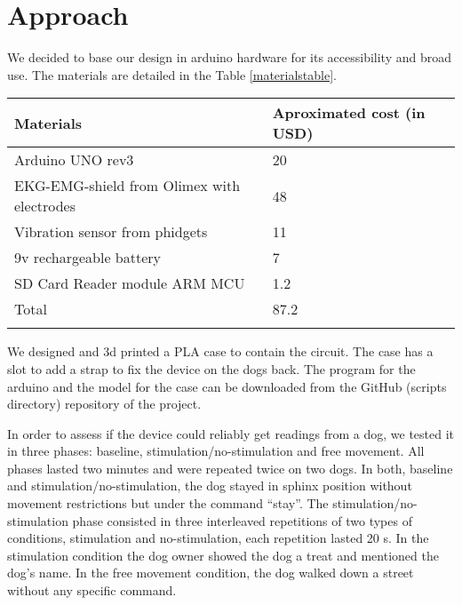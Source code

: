 \documentclass[twocolumn]{bmcart}%
\begin{document}
\section{Approach}\label{approach}

We decided to base our design in arduino hardware for its accessibility
and broad use. The materials are detailed in the Table
\ref{materialstable}.

\begin{table*}[t!]
\caption{\label{materialstable} Materials and cost. The table shows most of the materials used and their approximated cost with a local provider. Other materials were used but their cost is negligible.}
\begin{tabular}{l l}
 \hline\noalign{\smallskip}
   Materials  & Aproximated cost (in USD) \\
    \hline\noalign{\smallskip}
  Arduino UNO rev3                  & 20    \\
  EKG-EMG-shield from Olimex with electrodes    & 48    \\
  Vibration sensor from phidgets            & 11    \\
  9v rechargeable battery               & 7 \\
  SD Card Reader module ARM MCU         & 1.2   \\
  Total                     & 87.2  \\
  \noalign{\smallskip}\hline
\end{tabular}
\end{table*}

We designed and 3d printed a PLA case to contain the circuit. The case
has a slot to add a strap to fix the device on the dogs back. The
program for the arduino and the model for the case can be downloaded
from the GitHub (scripts directory) repository of the project.

In order to assess if the device could reliably get readings from a dog,
we tested it in three phases: baseline, stimulation/no-stimulation and
free movement. All phases lasted two minutes and were repeated twice on
two dogs. In both, baseline and stimulation/no-stimulation, the dog
stayed in sphinx position without movement restrictions but under the
command ``stay''. The stimulation/no-stimulation phase consisted in
three interleaved repetitions of two types of conditions, stimulation
and no-stimulation, each repetition lasted 20 s. In the stimulation
condition the dog owner showed the dog a treat and mentioned the dog's
name. In the free movement condition, the dog walked down a street
without any specific command.
\end{document}
